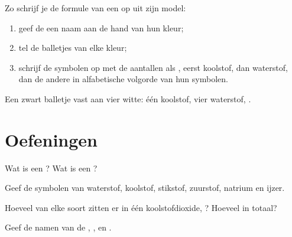 \begin{method}\label{met:g7:atoms-and-molecules:model}
Zo schrijf je de formule van een  op uit zijn model:
\begin{enumerate}
  \item geef de  een naam aan de hand van hun kleur;
  \item tel de balletjes van elke kleur;
  \item schrijf de symbolen op met de aantallen als , eerst
        koolstof, dan waterstof, dan de andere  in alfabetische
        volgorde van hun symbolen.
\end{enumerate}
Een zwart balletje vast aan vier witte: één koolstof, vier waterstof,
.
\end{method}

\section{Oefeningen}

\begin{exercise}[$\star$]\label{exo:g7:atoms-and-molecules:1}
Wat is een ? Wat is een ?
\end{exercise}

\begin{exercise}[$\star$]\label{exo:g7:atoms-and-molecules:2}
Geef de symbolen van waterstof, koolstof, stikstof, zuurstof, natrium en
ijzer.
\end{exercise}

\begin{exercise}[$\star$]\label{exo:g7:atoms-and-molecules:3}
Hoeveel  van elke soort zitten er in één  koolstofdioxide,
? Hoeveel  in totaal?
\end{exercise}

\begin{exercise}[$\star$]\label{exo:g7:atoms-and-molecules:4}
Geef de namen van de  , ,  en .
\end{exercise}

